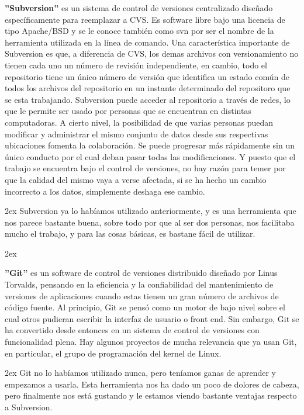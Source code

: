 \documentclass[12pt,a4paper]{report}
\begin{document}
\textbf{''Subversion''} es un sistema de control de versiones centralizado diseñado
específicamente para reemplazar a CVS. Es software libre bajo una licencia de
tipo Apache/BSD y se le conoce también como svn por ser el nombre de la
herramienta utilizada en la línea de comando.  Una característica importante de
Subversion es que, a diferencia de CVS, los demas archivos con versionamiento no
tienen cada uno un número de revisión independiente, en cambio, todo el
repositorio tiene un único número de versión que identifica un estado común de
todos los archivos del repositorio en un instante determinado del repositoro que
se esta trabajando. Subversion puede acceder al repositorio a través de redes,
lo que le permite ser usado por personas que se encuentran en distintas
computadoras. A cierto nivel, la posibilidad de que varias personas puedan
modificar y administrar el mismo conjunto de datos desde sus respectivas
ubicaciones fomenta la colaboración. Se puede progresar más rápidamente sin un
único conducto por el cual deban pasar todas las modificaciones. Y puesto que el
trabajo se encuentra bajo el control de versiones, no hay razón para temer por
que la calidad del mismo vaya a verse afectada, si se ha hecho un cambio
incorrecto a los datos, simplemente deshaga ese cambio. 

\parskip 2ex Subversion ya lo habíamos utilizado anteriormente, y es una
herramienta que nos parece bastante buena, sobre todo por que al ser dos
personas, nos facilitaba mucho el trabajo, y para las cosas básicas, es bastane
fácil de utilizar. 

\parskip 2ex

\textbf{''Git''} es un software de control de versiones distribuido diseñado por
Linus Torvalds, pensando en la eficiencia y la confiabilidad del mantenimiento
de versiones de aplicaciones cuando estas tienen un gran número de archivos de
código fuente. Al principio, Git se pensó como un motor de bajo nivel sobre el
cual otros pudieran escribir la interfaz de usuario o front end. Sin embargo,
Git se ha convertido desde entonces en un sistema de control de versiones con
funcionalidad plena. Hay algunos proyectos de mucha relevancia que ya usan Git,
en particular, el grupo de programación del kernel de Linux. 

\parskip 2ex 
Git no lo habíamos utilizado nunca, pero teníamos ganas de aprender y empezamos
a usarla. Esta herramienta nos ha dado un poco de dolores de cabeza, pero
finalmente nos está gustando y le estamos viendo bastante ventajas respecto a
Subversion. 
\end{document}

